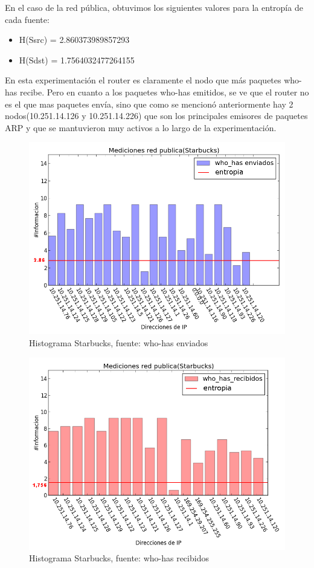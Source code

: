 En el caso de la red pública, obtuvimos los siguientes valores para la entropía de cada fuente:
\begin{itemize}
\item H(Ssrc) = 2.860373989857293
\item H(Sdst) = 1.7564032477264155
\end{itemize}

En esta experimentación el router es claramente el nodo que más paquetes who-has recibe. Pero en cuanto a los paquetes who-has emitidos, se ve que el router no es el que mas paquetes envía, sino que como se mencionó anteriormente hay 2 nodos(10.251.14.126 y 10.251.14.226) que son los principales emisores de paquetes ARP y que se mantuvieron muy activos a lo largo de la experimentación.

\begin{figure}[!h]
	\begin{center}
		  \includegraphics[scale=0.4]{Graficos/starbucks_sent_who_has.png}
		  \caption{Histograma Starbucks, fuente: who-has enviados}
		  \label{fig:contra1}
	\end{center}
\end{figure}

\begin{figure}[!h]
	\begin{center}
		  \includegraphics[scale=0.4]{Graficos/starbucks_received_who_has.png}
		  \caption{Histograma Starbucks, fuente: who-has recibidos}
		  \label{fig:contra1}
	\end{center}
\end{figure}



